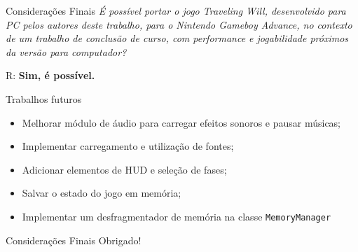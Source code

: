 \documentclass[notes, mathserif]{beamer}
\begin{document}
\begin{frame}{Considera\c c\~oes Finais}
	\textit{\'E poss\'ivel portar o jogo Traveling Will,
desenvolvido para PC pelos autores deste trabalho, para o Nintendo Gameboy Advance, no
contexto de um trabalho de conclus\~ao de curso, com performance e jogabilidade pr\'oximos
da vers\~ao para computador?}
\par
R: \textbf{Sim, \'e poss\'ivel.}
\end{frame}

\begin{frame}{Trabalhos futuros}
	\begin{itemize}[<+->]
		\item Melhorar m\'odulo de \'audio para carregar efeitos sonoros e pausar m\'usicas;
		\item Implementar carregamento e utiliza\c c\~ao de fontes;
		\item Adicionar elementos de HUD e sele\c c\~ao de fases;
		\item Salvar o estado do jogo em mem\'oria;
		\item Implementar um desfragmentador de mem\'oria na classe \texttt{MemoryManager}
	\end{itemize}
\end{frame}

\begin{frame}{Considera\c c\~oes Finais}
	Obrigado!
\end{frame}
\end{document}
